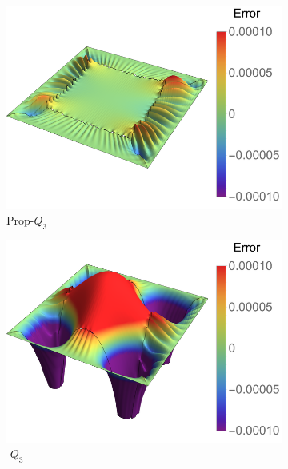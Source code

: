 \begin{figure}[ht]
	\center
	\captionsetup[subfigure]{labelformat=empty}
	\begin{subfigure}[t]{.45\linewidth}
		\center
		\includegraphics[scale=.52]{five_patch_biharmonic_op_contour}
		\caption{Prop-$Q_3$}
	\end{subfigure}
	\begin{subfigure}[t]{.45\linewidth}
		\center
		\includegraphics[scale=.52]{five_patch_biharmonic_Bezier_contour}
		\caption{\Bezier-$Q_3$}
	\end{subfigure}\\
	\center
	\begin{subfigure}[t]{.45\linewidth}
		\center

\end{subfigure}
\end{figure}
